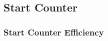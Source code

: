 \subsection{\label{sec:calib.st}Start Counter}

\subsubsection{\label{sec:calib.st.eff}Start Counter Efficiency}

\FloatBarrier
